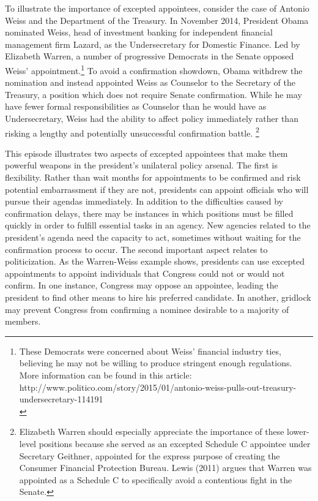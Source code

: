 \documentclass[12pt]{article}
\begin{document}
	To illustrate the importance of excepted appointees, consider the case of Antonio Weiss and the Department of the Treasury. In November 2014, President Obama nominated Weiss, head of investment banking for independent financial management firm Lazard, as the Undersecretary for Domestic Finance. Led by Elizabeth Warren, a number of progressive Democrats in the Senate opposed Weiss' appointment.\footnote{ These Democrats were concerned about Weiss' financial industry ties, believing he may not be willing to produce stringent enough regulations. More information can be found in this article: http://www.politico.com/story/2015/01/antonio-weiss-pulls-out-treasury-undersecretary-114191\\} To avoid a confirmation showdown, Obama withdrew the nomination and instead appointed Weiss as Counselor to the Secretary of the Treasury, a position which does not require Senate confirmation. While he may have fewer formal responsibilities as Counselor than he would have as Undersecretary, Weiss had the ability to affect policy immediately rather than risking a lengthy and potentially unsuccessful confirmation battle.	\footnote{ Elizabeth Warren should especially appreciate the importance of these lower-level positions because she served as an excepted Schedule C appointee under Secretary Geithner, appointed for the express purpose of creating the Consumer Financial Protection Bureau. Lewis (2011) argues that Warren was appointed as a Schedule C to specifically avoid a contentious fight in the Senate.}
	
	This episode illustrates two aspects of excepted appointees that make them powerful weapons in the president's unilateral policy arsenal. The first is flexibility. Rather than wait months for appointments to be confirmed and risk potential embarrassment if they are not, presidents can appoint officials who will pursue their agendas immediately.  In addition to the difficulties caused by confirmation delays, there may be instances in which positions must be filled quickly in order to fulfill essential tasks in an agency. New agencies related to the president's agenda need the capacity to act, sometimes without waiting for the confirmation process to occur. The second important aspect relates to politicization. As the Warren-Weiss example shows, presidents can use excepted appointments to appoint individuals that Congress could not or would not confirm. In one instance, Congress may oppose an appointee, leading the president to find other means to hire his preferred candidate. In another, gridlock may prevent Congress from confirming a nominee desirable to a majority of members.
	
\end{document}
